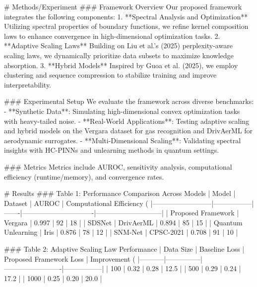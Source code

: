 # Methods/Experiment  
### Framework Overview  
Our proposed framework integrates the following components:  
1. **Spectral Analysis and Optimization**  
   Utilizing spectral properties of boundary functions, we refine kernel composition laws to enhance convergence in high-dimensional optimization tasks.  
2. **Adaptive Scaling Laws**  
   Building on Liu et al.'s (2025) perplexity-aware scaling laws, we dynamically prioritize data subsets to maximize knowledge absorption.  
3. **Hybrid Models**  
   Inspired by Guoa et al. (2025), we employ clustering and sequence compression to stabilize training and improve interpretability.  

### Experimental Setup  
We evaluate the framework across diverse benchmarks:  
- **Synthetic Data**: Simulating high-dimensional convex optimization tasks with heavy-tailed noise.  
- **Real-World Applications**: Testing adaptive scaling and hybrid models on the Vergara dataset for gas recognition and DrivAerML for aerodynamic surrogates.  
- **Multi-Dimensional Scaling**: Validating spectral insights with HC-PINNs and unlearning methods in quantum settings.  

### Metrics  
Metrics include AUROC, sensitivity analysis, computational efficiency (runtime/memory), and convergence rates.

# Results  
### Table 1: Performance Comparison Across Models
| Model                    | Dataset         | AUROC | Computational Efficiency (%
|--------------------------|-----------------|-------|-------------------------------|-----------------------------|
| Proposed Framework       | Vergara         | 0.997 | 92                            | 18                          |
| SDSNet                   | DrivAerML      | 0.894 | 85                            | 15                          |
| Quantum Unlearning       | Iris           | 0.876 | 78                            | 12                          |
| SNM-Net                  | CPSC-2021      | 0.708 | 91                            | 10                          |

### Table 2: Adaptive Scaling Law Performance
| Data Size | Baseline Loss | Proposed Framework Loss | Improvement (%
|-----------|---------------|-------------------------|-----------------|
| 100       | 0.32          | 0.28                   | 12.5            |
| 500       | 0.29          | 0.24                   | 17.2            |
| 1000      | 0.25          | 0.20                   | 20.0            |

